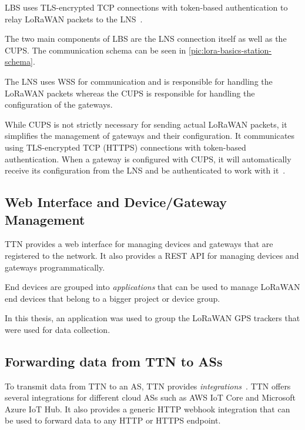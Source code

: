 \ac{LBS} uses \ac{TLS}-encrypted \ac{TCP} connections with token-based authentication to relay \ac{LoRaWAN} packets to the \ac{LNS}~\cite{the_things_industries_bv_lora_2022}.

The two main components of \acl{LBS} are the \ac{LNS} connection itself as well as the \acf{CUPS}.
The communication schema can be seen in \cref{pic:lora-basics-station-schema}.

The \ac{LNS} uses \ac{WSS} for communication and is responsible for handling the \ac{LoRaWAN} packets whereas the \acl{CUPS} is responsible for handling the configuration of the gateways.

While \ac{CUPS} is not strictly necessary for sending actual \ac{LoRaWAN} packets, it simplifies the management of gateways and their configuration.
It communicates using \ac{TLS}-encrypted \ac{TCP} (\ac{HTTPS}) connections with token-based authentication.
When a gateway is configured with \ac{CUPS}, it will automatically receive its configuration from the \ac{LNS} and be authenticated to work with it~\cite{the_things_industries_bv_lora_2022}.

\subsection{Web Interface and Device/Gateway Management}\label{sec:web-interface-and-device-gateway-management}

\ac{TTN} provides a web interface for managing devices and gateways that are registered to the network.
It also provides a \ac{REST} \ac{API} for managing devices and gateways programmatically.

End devices are grouped into \emph{applications} that can be used to manage \ac{LoRaWAN} end devices that belong to a bigger project or device group.

In this thesis, an application was used to group the \ac{LoRaWAN} \ac{GPS} trackers that were used for data collection.

\subsection{Forwarding data from \acf{TTN} to \acfp{AS}}\label{sec:forwarding-data-from-ttn-to-as}

To transmit data from \ac{TTN} to an \ac{AS}, \ac{TTN} provides \emph{integrations}~\cite{the_things_network_integrations_2021}.
\ac{TTN} offers several integrations for different cloud \acp{AS} such as \ac{AWS} IoT Core and Microsoft Azure IoT Hub.
It also provides a generic \ac{HTTP} webhook integration that can be used to forward data to any \ac{HTTP} or \ac{HTTPS} endpoint.

